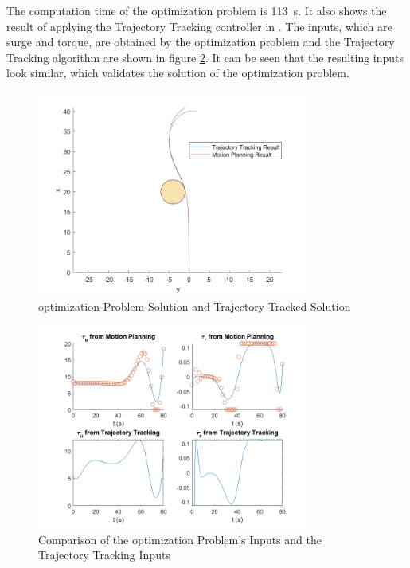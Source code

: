 \par The computation time of the optimization problem is \SI{113}{\second}. It also shows the result of applying the Trajectory Tracking controller in \cite{Vanni2007CoordinatedMC}. The inputs, which are surge and torque, are obtained by the optimization problem and the Trajectory Tracking algorithm are shown in figure \ref{fig:inputscomparison}. It can be seen that the resulting inputs look similar, which validates the solution of the optimization problem.

\begin{figure}[h!]
\centering
\includegraphics[width=0.8\textwidth]{Images/results/trajectrackedprob.png}
\caption{optimization Problem Solution and Trajectory Tracked Solution}
\label{fig:trajectrackedprob}
\end{figure}

\begin{figure}[h!]
\centering
\includegraphics[width=0.8\textwidth]{Images/results/inputscomparison.png}
\caption{Comparison of the optimization Problem's Inputs and the Trajectory Tracking Inputs}
\label{fig:inputscomparison}
\end{figure}


